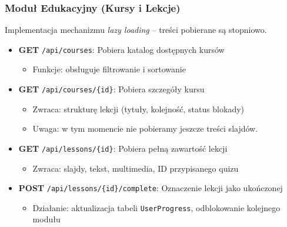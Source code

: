 \documentclass[11pt,a4paper]{article}
\numberwithin{equation}{section}
\begin{document}
\subsubsection{Moduł Edukacyjny (Kursy i Lekcje)}
Implementacja mechanizmu \textit{lazy loading} – treści pobierane są stopniowo.
\begin{itemize}
    \item \textbf{GET} \texttt{/api/courses}: Pobiera katalog dostępnych kursów
        \begin{itemize}
            \item Funkcje: obsługuje filtrowanie i sortowanie
        \end{itemize}
    \item \textbf{GET} \texttt{/api/courses/\{id\}}: Pobiera szczegóły kursu
        \begin{itemize}
            \item Zwraca: strukturę lekcji (tytuły, kolejność, status blokady)
            \item Uwaga: w tym momencie nie pobieramy jeszcze treści slajdów.
        \end{itemize}
    \item \textbf{GET} \texttt{/api/lessons/\{id\}}: Pobiera pełną zawartość lekcji
        \begin{itemize}
            \item Zwraca: slajdy, tekst, multimedia, ID przypisanego quizu
        \end{itemize}
    \item \textbf{POST} \texttt{/api/lessons/\{id\}/complete}: Oznaczenie lekcji jako ukończonej
        \begin{itemize}
            \item Działanie: aktualizacja tabeli \texttt{UserProgress}, odblokowanie kolejnego modułu
        \end{itemize}
\end{itemize}
\end{document}
